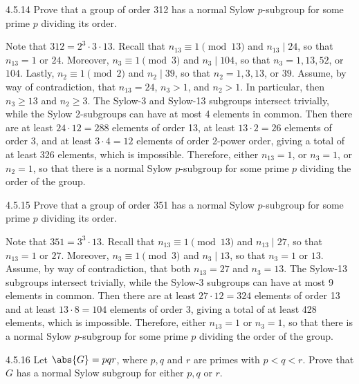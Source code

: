 \begin{exercise}{4.5.14}
	Prove that a group of order 312 has a normal Sylow $p$-subgroup for some prime $p$ dividing its order.
\end{exercise}

\begin{sol}
	Note that $312 = 2^3 \cdot 3 \cdot 13$.
	Recall that $n_{13} \equiv 1 \pmod 13$ and $n_{13} \mid 24$, so that $n_{13} = 1$ or $24$.
	Moreover, $n_3 \equiv 1 \pmod 3$ and $n_3 \mid 104$, so that $n_3 = 1, 13, 52$, or $104$.
	Lastly, $n_2 \equiv 1 \pmod 2$ and $n_2 \mid 39$, so that $n_2 = 1, 3, 13$, or $39$.
	Assume, by way of contradiction, that $n_{13} = 24$, $n_3 > 1$, and $n_2 > 1$.
	In particular, then $n_3 \geq 13$ and $n_2 \geq 3$.
	The Sylow-3 and Sylow-13 subgroups intersect trivially, while the Sylow 2-subgroups can have at most 4 elements in common.
	Then there are at least $24 \cdot 12 = 288$ elements of order 13, at least $13 \cdot 2 = 26$ elements of order 3, and at least $3 \cdot 4 = 12$ elements of order 2-power order, giving a total of at least 326 elements, which is impossible.
	Therefore, either $n_{13} = 1$, or $n_3 = 1$, or $n_2 = 1$, so that there is a normal Sylow $p$-subgroup for some prime $p$ dividing the order of the group.
\end{sol}

\begin{exercise}{4.5.15}
	Prove that a group of order 351 has a normal Sylow $p$-subgroup for some prime $p$ dividing its order.
\end{exercise}

\begin{sol}
	Note that $351 = 3^3 \cdot 13$.
	Recall that $n_{13} \equiv 1 \pmod 13$ and $n_{13} \mid 27$, so that $n_{13} = 1$ or $27$.
	Moreover, $n_3 \equiv 1 \pmod 3$ and $n_3 \mid 13$, so that $n_3 = 1$ or $13$.
	Assume, by way of contradiction, that both $n_{13} = 27$ and $n_3 = 13$.
	The Sylow-13 subgroups intersect trivially, while the Sylow-3 subgroups can have at most 9 elements in common.
	Then there are at least $27 \cdot 12 = 324$ elements of order 13 and at least $13 \cdot 8 = 104$ elements of order 3, giving a total of at least 428 elements, which is impossible.
	Therefore, either $n_{13} = 1$ or $n_3 = 1$, so that there is a normal Sylow $p$-subgroup for some prime $p$ dividing the order of the group.
\end{sol}

\begin{exercise}{4.5.16}
	Let $\abs{G} = pqr$, where $p, q$ and $r$ are primes with $p < q < r$.
	Prove that $G$ has a normal Sylow subgroup for either $p, q$ or $r$.
\end{exercise}

